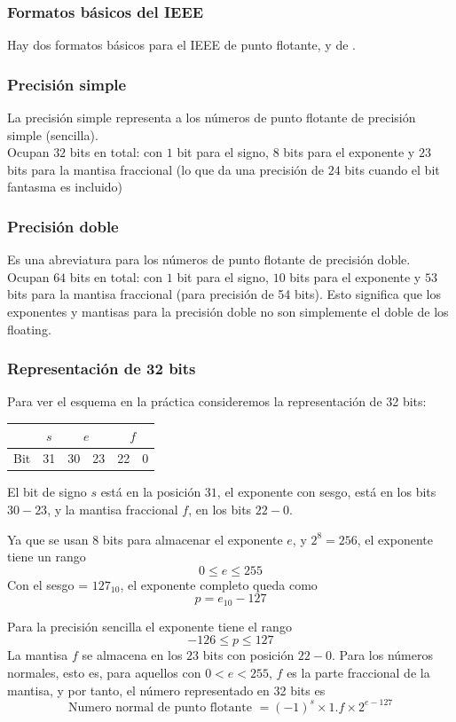 \begin{frame}
\frametitle{Formatos básicos del IEEE}
Hay dos formatos básicos para el IEEE de punto flotante,  y de .
\end{frame}
\begin{frame}
\frametitle{Precisión simple}
La precisión simple representa a los números de punto flotante de precisión simple (sencilla).
\\
\bigskip
Ocupan $32$ bits en total: con $1$ bit para el signo, $8$ bits para el exponente y $23$ bits para la mantisa fraccional (lo que da una precisión de $24$ bits cuando el bit fantasma es incluido)
\end{frame}
\begin{frame}
\frametitle{Precisión doble}
Es una abreviatura para los números de punto flotante de precisión doble.
\\
\bigskip
Ocupan $64$ bits en total: con $1$ bit para el signo, $10$ bits para el exponente y $53$ bits para la mantisa fraccional (para precisión de 54 bits). Esto significa que los exponentes y mantisas para la precisión doble no son simplemente el doble de los floating.
\end{frame}
\begin{frame}
\frametitle{Representación de 32 bits}
Para ver el esquema en la práctica consideremos la representación de 32 bits:
\begin{table}
\fontsize{12}{12}\selectfont
\begin{tabular}{l | c | c | c | c | c|}
\cline{2-6}
 {} & $s$ & \multicolumn{2}{c|}{$e$} & \multicolumn{2}{c|}{$f$} \\ \hline
 Bit & 31 & 30 & 23 & 22 & 0 \\ \hline
\end{tabular}
\end{table}
\pause
El bit de signo $s$ está en la posición $31$, el exponente con sesgo, está en los bits $30-23$, y la mantisa fraccional $f$, en los bits $22 - 0$.
\end{frame}
\begin{frame}
Ya que se usan $8$ bits para almacenar el exponente $e$, y $2^{8} = 256$, el exponente tiene un rango
\[ 0 \leq e \leq 255 \]
\pause
Con el sesgo = $127_{10}$, el exponente completo queda como
\[ p = e_{10} - 127 \]
\end{frame}
\begin{frame}
Para la precisión sencilla el exponente tiene el rango
\[ -126 \leq p \leq 127 \]
La mantisa $f$ se almacena en los $23$ bits con posición $22-0$. Para los números normales, esto es, para aquellos con $0 < e < 255$, $f$ es la parte fraccional de la mantisa, y por tanto, el número representado en 32 bits es
\[ \text{Numero normal de punto flotante } = (-1)^{s} \times 1.f \times 2^{e-127} \]
\end{frame}
